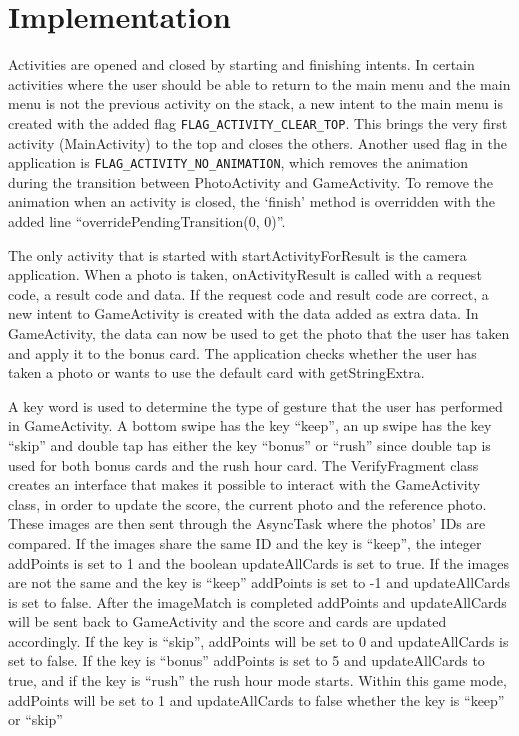 \section{Implementation}
Activities are opened and closed by starting and finishing intents. In certain activities where the user should be able to return to the main menu and the main menu is not the previous activity on the stack, a new intent to the main menu is created with the added flag \verb|FLAG_ACTIVITY_CLEAR_TOP|. This brings the very first activity (MainActivity) to the top and closes the others. Another used flag in the application is \verb|FLAG_ACTIVITY_NO_ANIMATION|, which removes the animation during the transition between PhotoActivity and GameActivity. To remove the animation when an activity is closed, the ‘finish’ method is overridden with the added line “overridePendingTransition(0, 0)”. \newline

The only activity that is started with startActivityForResult is the camera application. When a photo is taken, onActivityResult is called with a request code, a result code and data. If the request code and result code are correct, a new intent to GameActivity is created with the data added as extra data. In GameActivity, the data can now be used to get the photo that the user has taken and apply it to the bonus card. The application checks whether the user has taken a photo or wants to use the default card with getStringExtra. \newline

A key word is used to determine the type of gesture that the user has performed in GameActivity. A bottom swipe has the key “keep”, an up swipe has the key “skip” and double tap has either the key “bonus” or “rush” since double tap is used for both bonus cards and the rush hour card.  The VerifyFragment class creates an interface that makes it possible to interact with the GameActivity class, in order to update the score, the current photo and the reference photo. These images are then sent through the AsyncTask where the photos’ IDs are compared.  If the images share the same ID and the key is “keep”, the integer addPoints is set to 1 and the boolean updateAllCards is set to true. If the images are not the same and the key is “keep” addPoints is set to -1 and updateAllCards is set to false. After the imageMatch is completed addPoints and updateAllCards will be sent back to GameActivity and the score and cards are updated accordingly. If the key is “skip”, addPoints will be set to 0 and updateAllCards is set to false. If the key is “bonus” addPoints is set to 5 and updateAllCards to true, and if the key is “rush” the rush hour mode starts. Within this game mode, addPoints will be set to 1 and updateAllCards to false whether the key is “keep” or “skip” \newline

